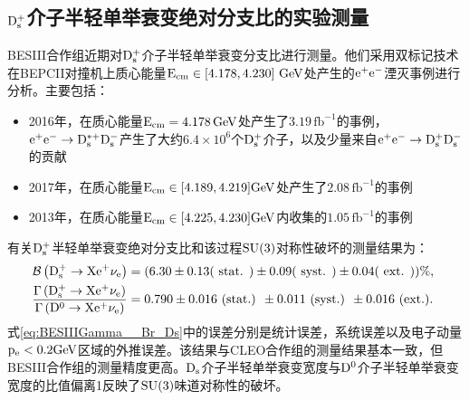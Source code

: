 
\subsection{$\mathrm{D_s^+}$介子半轻单举衰变绝对分支比的实验测量}

BESIII合作组近期对$\mathrm{D_s^{+}}$介子半轻单举衰变分支比进行测量\cite{BESIII:2021duu}。他们采用双标记技术在BEPCII对撞机上质心能量$\mathrm{E_{\text{cm}} \in [4.178, 4.230] \ \mathrm{GeV}}$处产生的$\mathrm{e^{+} e^{-}}$湮灭事例进行分析。主要包括：
\begin{itemize}
\item 2016年，在质心能量$\mathrm{E_{\mathrm{cm}}}=4.178 \, \text{GeV}$处产生了$3.19 \, \mathrm{fb}^{-1}$的事例，$\mathrm{e^{+} e^{-} \rightarrow D_s^{*+} D_s^{-}}$产生了大约$6.4 \times 10^6$个$\mathrm{D_s^{+}}$介子，以及少量来自$\mathrm{e^{+} e^{-} \rightarrow D_s^{+} D_s^{-}}$的贡献
\item 2017年，在质心能量$\mathrm{E_{\mathrm{cm}}}\in [4.189, 4.219]\mathrm{GeV}$处产生了$2.08 \, \mathrm{fb}^{-1}$的事例
\item 2013年，在质心能量$\mathrm{E_{\mathrm{cm}}}\in [4.225, 4.230 ]\mathrm{GeV}$内收集的$1.05 \, \mathrm{fb}^{-1}$的事例
\end{itemize}

有关$\mathrm{D_s^+}$半轻单举衰变绝对分支比和该过程$\mathrm{SU(3)}$对称性破坏的测量结果为：
\begin{equation}
    \begin{aligned}
     \mathcal{B}\left(\mathrm{D_s^{+} \rightarrow X e^{+} \nu_e}\right) 
    &=(6.30 \pm 0.13(\text { stat. }) \pm 0.09(\text { syst. }) \pm 0.04(\text { ext. })) \%,\\
         \frac{\Gamma\left(\mathrm{D_s^{+} \rightarrow X e^{+} \nu_e}\right)}{\mathrm{\Gamma\left(D^0 \rightarrow X e^{+} \nu_e\right)}} 
         &=0.790 \pm 0.016 \text { (stat.) } \pm 0.011 \text { (syst.) } \pm 0.016 \text { (ext.). }\\
    \end{aligned}
         \label{eq:BESIIIGamma__Br_Ds}  
        \end{equation}
式\eqref{eq:BESIIIGamma__Br_Ds}中的误差分别是统计误差，系统误差以及电子动量$\mathrm{p_e<0.2\mathrm{GeV}}$区域的外推误差。该结果与CLEO合作组的测量结果基本一致，但BESIII合作组的测量精度更高。$\mathrm{D_s}$介子半轻单举衰变宽度与$\mathrm{D^0}$介子半轻单举衰变宽度的比值偏离1反映了$\mathrm{SU(3)}$味道对称性的破坏。

